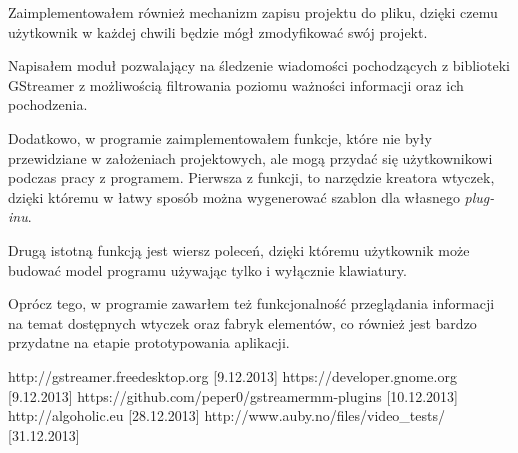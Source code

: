 \documentclass[12pt]{article}
\begin{document}
Zaimplementowałem również mechanizm zapisu projektu do pliku, dzięki czemu użytkownik w każdej chwili będzie mógł zmodyfikować swój projekt. 

Napisałem moduł pozwalający na śledzenie wiadomości pochodzących z biblioteki GStreamer z możliwością filtrowania poziomu ważności informacji oraz ich pochodzenia.

Dodatkowo, w programie zaimplementowałem funkcje, które nie były przewidziane w założeniach projektowych, ale mogą przydać się użytkownikowi podczas pracy z programem. Pierwsza z funkcji, to narzędzie kreatora wtyczek, dzięki któremu w łatwy sposób można wygenerować szablon dla własnego \textit{plug-inu}. 

Drugą istotną funkcją jest wiersz poleceń, dzięki któremu użytkownik może budować model programu używając tylko i wyłącznie klawiatury.

Oprócz tego, w programie zawarłem też funkcjonalność przeglądania informacji na temat dostępnych wtyczek oraz fabryk elementów, co również jest bardzo przydatne na etapie prototypowania aplikacji.
\cleardoublepage
\begin{thebibliography}{9}

  http://gstreamer.freedesktop.org [9.12.2013]
  https://developer.gnome.org [9.12.2013]
  https://github.com/peper0/gstreamermm-plugins [10.12.2013]
  http://algoholic.eu [28.12.2013]
  http://www.auby.no/files/video\_tests/ [31.12.2013]
\end{thebibliography}
\end{document}
